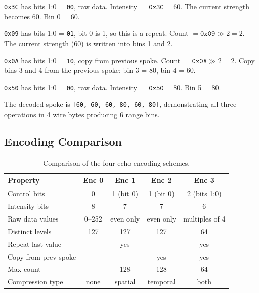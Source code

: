 \documentclass[11pt,letterpaper]{article}
\begin{document}
\texttt{0x3C} has bits 1:0 = \texttt{00}, raw data. Intensity $= \texttt{0x3C} = 60$. The current strength becomes 60. Bin 0 = 60.

\texttt{0x09} has bits 1:0 = \texttt{01}, bit 0 is 1, so this is a repeat. Count $= \texttt{0x09} \gg 2 = 2$. The current strength (60) is written into bins 1 and 2.

\texttt{0x0A} has bits 1:0 = \texttt{10}, copy from previous spoke. Count $= \texttt{0x0A} \gg 2 = 2$. Copy bins 3 and 4 from the previous spoke: bin 3 = 80, bin 4 = 60.

\texttt{0x50} has bits 1:0 = \texttt{00}, raw data. Intensity $= \texttt{0x50} = 80$. Bin 5 = 80.

The decoded spoke is \texttt{[60, 60, 60, 80, 60, 80]}, demonstrating all three operations in 4 wire bytes producing 6 range bins.

\subsection{Encoding Comparison}

\begin{table}[H]
\centering
\caption{Comparison of the four echo encoding schemes.}
\label{tab:encoding}
\begin{tabular}{@{}lcccc@{}}
\toprule
\textbf{Property} & \textbf{Enc 0} & \textbf{Enc 1} & \textbf{Enc 2} & \textbf{Enc 3} \\
\midrule
Control bits        & 0             & 1 (bit 0)      & 1 (bit 0)      & 2 (bits 1:0) \\
Intensity bits      & 8             & 7              & 7              & 6 \\
Raw data values     & 0--252        & even only      & even only      & multiples of 4 \\
Distinct levels     & 127           & 127            & 127            & 64 \\
Repeat last value   & ---           & yes            & ---            & yes \\
Copy from prev spoke & ---          & ---            & yes            & yes \\
Max count           & ---           & 128            & 128            & 64 \\
Compression type    & none          & spatial         & temporal       & both \\
\bottomrule
\end{tabular}
\end{table}
\end{document}
